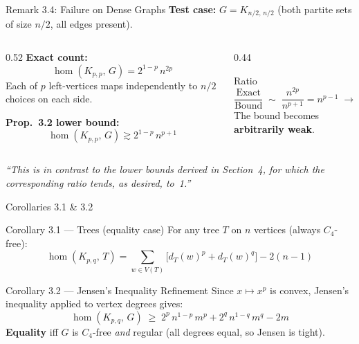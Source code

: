 \documentclass[aspectratio=169]{beamer}
\begin{document}
\begin{frame}{Remark 3.4: Failure on Dense Graphs}
  \textbf{Test case:} $G = K_{n/2,\,n/2}$ (both partite sets of size $n/2$, all edges present).

  \begin{columns}
    \begin{column}{0.52\textwidth}
      \textbf{Exact count:}
      \[
        \hom(K_{p,p},\,G) = 2^{1-p}\,n^{2p}
      \]
      Each of $p$ left-vertices maps independently to $n/2$ choices on each side.

      \textbf{Prop.\ 3.2 lower bound:}
      \[
        \hom(K_{p,p},\,G) \gtrsim 2^{1-p}\,n^{p+1}
      \]
    \end{column}
    \begin{column}{0.44\textwidth}
      \begin{alertblock}{Ratio}
        \[
          \frac{\text{Exact}}{\text{Bound}} \;\sim\; \frac{n^{2p}}{n^{p+1}} = n^{p-1} \;\to\; \infty
        \]
        The bound becomes \textbf{arbitrarily weak}.
      \end{alertblock}
    \end{column}
  \end{columns}

  \vspace{0.5em}
  \textit{``This is in contrast to the lower bounds derived in Section~4, for which the corresponding ratio tends, as desired, to~1.''}
\end{frame}

\begin{frame}{Corollaries 3.1 \& 3.2}
  \begin{block}{Corollary 3.1 --- Trees (equality case)}
    For any tree $T$ on $n$ vertices (always $C_4$-free):
    \[
      \hom(K_{p,q},\,T) = \sum_{w \in V(T)} \bigl[d_T(w)^p + d_T(w)^q\bigr] - 2(n-1)
    \]
  \end{block}

  \begin{block}{Corollary 3.2 --- Jensen's Inequality Refinement}
    Since $x \mapsto x^p$ is convex, Jensen's inequality applied to vertex degrees gives:
    \[
      \hom(K_{p,q},\,G) \;\geq\; 2^p\,n^{1-p}\,m^p + 2^q\,n^{1-q}\,m^q - 2m
    \]
    \textbf{Equality} iff $G$ is $C_4$-free \emph{and} regular (all degrees equal, so Jensen is tight).
  \end{block}
\end{frame}
\end{document}
